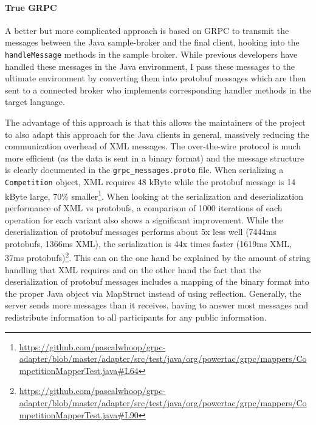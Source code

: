 \paragraph{True GRPC}%
\label{sub:grpc_based_communication}

A better but more complicated approach is based on \ac{GRPC} to transmit the messages between the Java sample-broker and
the final client, hooking into the \texttt{handleMessage} methods in the sample broker.
While previous developers have handled these messages in the Java environment, I
pass these messages to the ultimate environment by converting them into protobuf messages which are then sent to a
connected broker who implements corresponding handler methods in the target language.

The advantage of this approach is that this allows the maintainers of the project to also adapt this approach for the
Java clients in general, massively reducing the communication overhead of \ac{XML} messages. The over-the-wire protocol
is much more
efficient (as the data is sent in a binary format) and the message structure is clearly documented in the
\texttt{grpc\_messages.proto} file. When serializing a \texttt{Competition} object, \ac{XML} requires 48 kByte while
the protobuf message is 14 kByte large, 70\%
smaller\footnote{\url{https://github.com/pascalwhoop/grpc-adapter/blob/master/adapter/src/test/java/org/powertac/grpc/mappers/CompetitionMapperTest.java\#L64}}.
When looking at the serialization and deserialization performance of \ac{XML} vs protobufs, a comparison of 1000
iterations of each operation for each variant also shows a significant improvement. While the deserialization of
protobuf messages performs about 5x less well (7444ms protobufs, 1366ms \ac{XML}), the serialization is 44x times
faster (1619ms \ac{XML}, 37ms
protobufs)\footnote{\url{https://github.com/pascalwhoop/grpc-adapter/blob/master/adapter/src/test/java/org/powertac/grpc/mappers/CompetitionMapperTest.java\#L90}}.
This can on the one hand be explained by the amount of string handling that \ac{XML} requires and on the other hand the fact that the
deserialization of protobuf messages includes a mapping of the binary format into the proper Java object via MapStruct instead
of using reflection. Generally, the server sends more messages than it receives, having to answer most messages and
redistribute information to all participants for any public information.


